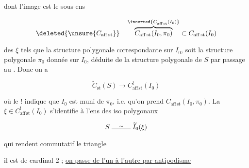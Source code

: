 
dont l'image est le sous-ens

\[
\deleted{\unsure{C_{\mathrm{aff\,st}}}}\quad
\overbrace{C_{\mathrm{aff\,st}}(I_0,\pi_0)}^{\inserted{C_{\mathrm{aff\,st}}^{!}(I_0)}}\subset C_{\mathrm{aff\,st}}(I_0)
\]

 des $\xi$ tels que la structure polygonale correspondante sur $I_0$, soit la structure polygonale $\pi_0$ donnée sur $I_0$, déduite de la structure polygonale de $S$ par passage au . Donc on a

\[
\widetilde C_{\mathrm{st}}(S)\longrightarrow C_{\mathrm{aff\,st}}^{!}(I_0)
\]

où le ! indique que $I_0$ est muni de $\pi_0$, i.e. qu'on prend $C_{\mathrm{aff\,st}}(I_0,\pi_0)$. La   $\xi\in C_{\mathrm{aff\,st}}^{!}(I_0)$ s'identifie à l'ens des iso polygonaux

\[
S\mathrel{\overset{\sim}{\rule{2.8em}{0.4pt}}}\widetilde I_0(\xi)
\]

qui  rendent commutatif le triangle


il est de cardinal $2$ ; \uline{on passe de l'un à l'autre par antipodisme}

